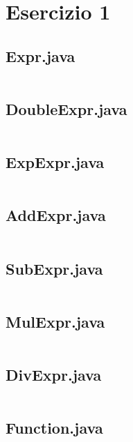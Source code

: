 \section*{Esercizio 1}

\subsection*{Expr.java}
\inputminted{java}{src/Expr.java}

\subsection*{DoubleExpr.java}
\inputminted{java}{src/DoubleExpr.java}

\subsection*{ExpExpr.java}
\inputminted{java}{src/ExpExpr.java}

\subsection*{AddExpr.java}
\inputminted{java}{src/AddExpr.java}

\subsection*{SubExpr.java}
\inputminted{java}{src/SubExpr.java}

\subsection*{MulExpr.java}
\inputminted{java}{src/MulExpr.java}

\subsection*{DivExpr.java}
\inputminted{java}{src/DivExpr.java}

\subsection*{Function.java}
\inputminted{java}{src/Function.java}
